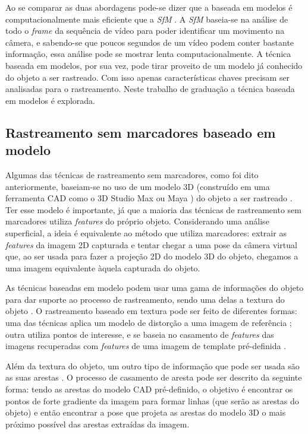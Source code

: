 Ao se comparar as duas abordagens pode-se dizer que a baseada em modelos é computacionalmente mais eficiente que a \emph{SfM} \cite{drummondecipolla}. A \emph{SfM} baseia-se na análise de todo o \emph{frame} da sequência de vídeo para poder identificar um movimento na câmera, e sabendo-se que poucos segundos de um vídeo podem conter bastante informação, essa análise pode se mostrar lenta computacionalmente. A técnica baseada em modelos, por sua vez, pode tirar proveito de um modelo já conhecido do objeto a ser rastreado. Com isso apenas características chaves precisam ser analisadas para o rastreamento. Neste trabalho de graduação a técnica baseada em modelos é explorada.

\subsection{Rastreamento sem marcadores baseado em modelo}

Algumas das técnicas de rastreamento sem marcadores, como foi dito anteriormente, baseiam-se no uso de um modelo 3D (construído em uma ferramenta CAD como o 3D Studio Max \cite{ref_3dsmax} ou Maya \cite{ref_maya}) do objeto a ser rastreado \cite{lepetit}. Ter esse modelo é importante, já que a maioria das técnicas de rastreamento sem marcadores utiliza \emph{features} do próprio objeto. Considerando uma análise superficial, a ideia é equivalente ao método que utiliza marcadores: extrair as \emph{features} da imagem 2D capturada e tentar chegar a uma pose da câmera virtual que, ao ser usada para fazer a projeção 2D do modelo 3D do objeto, chegamos a uma imagem equivalente àquela capturada do objeto.

As técnicas baseadas em modelo podem usar uma gama de informações do objeto para dar suporte ao processo de rastreamento, sendo uma delas a textura do objeto \cite{lima2010model}. O rastreamento baseado em textura pode ser feito de diferentes formas: uma das técnicas aplica um modelo de distorção a uma imagem de referência \cite{ref_19tgchico}; outra utiliza pontos de interesse, e se baseia no casamento de \emph{features} das imagens recuperadas com \emph{features} de uma imagem de template pré-definida \cite{lepetit}.

Além da textura do objeto, um outro tipo de informação que pode ser usada são as suas arestas \cite{lepetit}. O processo de casamento de aresta pode ser descrito da seguinte forma: tendo as arestas do modelo CAD pré-definido, o objetivo é encontrar os pontos de forte gradiente da imagem para formar linhas (que serão as arestas do objeto) e então encontrar a pose que projeta as arestas do modelo 3D o mais próximo possível das arestas extraídas da imagem.


